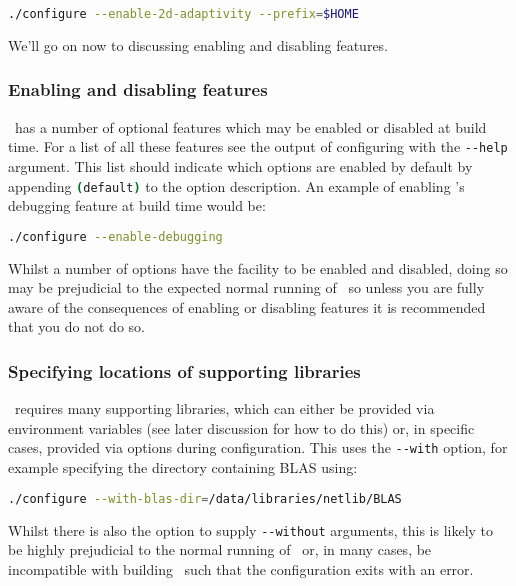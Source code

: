 \begin{lstlisting}[language=Bash]
./configure --enable-2d-adaptivity --prefix=$HOME
\end{lstlisting}

We'll go on now to discussing enabling and disabling features.

\subsubsection{Enabling and disabling features}
\label{sec:configure_enable_disable_features}

\fluidity\ has a number of optional features which may be enabled or disabled at
build time. For a list of all these features see the output of configuring with
the \lstinline[language=Bash]+--help+ argument. This list should indicate which
options are enabled by default by appending
\lstinline[language=Bash]+(default)+ to the option description. An example of
enabling \fluidity's debugging feature at build time would be:

\begin{lstlisting}[language=Bash]
./configure --enable-debugging
\end{lstlisting}

Whilst a number of options have the facility to be enabled and disabled, doing
so may be prejudicial to the expected normal running of \fluidity\ so unless you
are fully aware of the consequences of enabling or disabling features it is
recommended that you do not do so.

\subsubsection{Specifying locations of supporting libraries}
\label{sec:configure_locate_supporting_libs}

\fluidity\ requires many supporting libraries, which can either be provided via
environment variables (see later discussion for how to do this) or, in specific
cases, provided via options during configuration. This uses the
\lstinline[language=Bash]+--with+ option, for example specifying the directory
containing BLAS using:

\begin{lstlisting}[language=Bash]
./configure --with-blas-dir=/data/libraries/netlib/BLAS
\end{lstlisting}

Whilst there is also the option to supply \lstinline[language=Bash]+--without+
arguments, this is likely to be highly prejudicial to the normal running of
\fluidity\ or, in many cases, be incompatible with building \fluidity\ such that
the configuration exits with an error.

